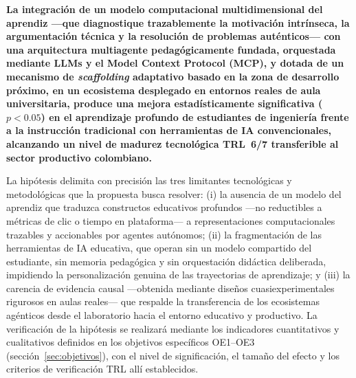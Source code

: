 
\medskip

\noindent\textbf{La integración de un modelo computacional multidimensional del
aprendiz —que diagnostique trazablemente la motivación intrínseca, la argumentación
técnica y la resolución de problemas auténticos— con una arquitectura multiagente
pedagógicamente fundada, orquestada mediante LLMs y el Model Context Protocol (MCP),
y dotada de un mecanismo de \emph{scaffolding} adaptativo basado en la zona de
desarrollo próximo, en un ecosistema desplegado en entornos reales de aula
universitaria, produce una mejora estadísticamente significativa ($p < 0.05$) en el
aprendizaje profundo de estudiantes de ingeniería frente a la instrucción tradicional
con herramientas de IA convencionales, alcanzando un nivel de madurez tecnológica
TRL~6/7 transferible al sector productivo colombiano.}

\medskip

\noindent La hipótesis delimita con precisión las tres limitantes tecnológicas y
metodológicas que la propuesta busca resolver: (i) la ausencia de un modelo del
aprendiz que traduzca constructos educativos profundos —no reductibles a métricas de
clic o tiempo en plataforma— a representaciones computacionales trazables y
accionables por agentes autónomos; (ii) la fragmentación de las herramientas de IA
educativa, que operan sin un modelo compartido del estudiante, sin memoria pedagógica
y sin orquestación didáctica deliberada, impidiendo la personalización genuina de las
trayectorias de aprendizaje; y (iii) la carencia de evidencia causal —obtenida
mediante diseños cuasiexperimentales rigurosos en aulas reales— que respalde la
transferencia de los ecosistemas agénticos desde el laboratorio hacia el entorno
educativo y productivo. La verificación de la hipótesis se realizará mediante los
indicadores cuantitativos y cualitativos definidos en los objetivos específicos
OE1--OE3 (sección~\ref{sec:objetivos}), con el nivel de significación, el tamaño del
efecto y los criterios de verificación TRL allí establecidos.
